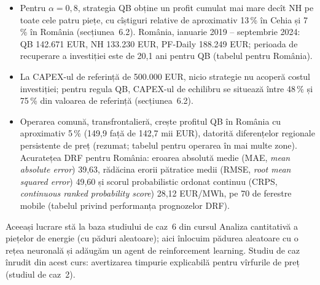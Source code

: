\textbf{}
\begin{itemize}
\item {}%
{Pentru $\alpha=0{,}8$, strategia QB obține un profit cumulat mai mare decît NH pe toate cele patru piețe, cu cîștiguri relative de aproximativ 13\,\% în Cehia și 7\,\% în România (secțiunea~6.2).
România, ianuarie 2019 -- septembrie 2024: QB 142.671 EUR, NH 133.230 EUR, PF-Daily 188.249 EUR; perioada de recuperare a investiției este de 20,1 ani pentru QB (tabelul pentru România).}
\item {}%
{La CAPEX-ul de referință de 500.000 EUR, nicio strategie nu acoperă costul investiției; pentru regula QB, CAPEX-ul de echilibru se situează între 48\,\% și 75\,\% din valoarea de referință (secțiunea~6.2).}
\item {}%
{Operarea comună, transfrontalieră, crește profitul QB în România cu aproximativ 5\,\% (149,9 față de 142,7 mii EUR), datorită diferențelor regionale persistente de preț (rezumat; tabelul pentru operarea în mai multe zone).
Acuratețea DRF pentru România: eroarea absolută medie (MAE, \emph{mean absolute error}) 39,63, rădăcina erorii pătratice medii (RMSE, \emph{root mean squared error}) 49,60 și scorul probabilistic ordonat continuu (CRPS, \emph{continuous ranked probability score}) 28,12 EUR/MWh, pe 70 de ferestre mobile (tabelul privind performanța prognozelor DRF).}
\end{itemize}
{\footnotesize\color{FooterGray}%
{Aceeași lucrare stă la baza studiului de caz~6 din cursul Analiza cantitativă a piețelor de energie (cu păduri aleatoare); aici înlocuim pădurea aleatoare cu o rețea neuronală și adăugăm un agent de reinforcement learning. Studiu de caz înrudit din acest curs: avertizarea timpurie explicabilă pentru vîrfurile de preț (studiul de caz~2).}}

